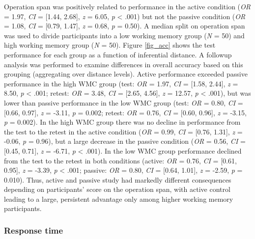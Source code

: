 \documentclass[floatsintext,man]{apa6}
\theoremstyle{definition}
\theoremstyle{definition}
\theoremstyle{definition}
\theoremstyle{remark}
\begin{document}
Operation span was positively related to performance in the active
condition (\emph{OR} = 1.97, \emph{CI} = {[}1.44, 2.68{]}, \emph{z} =
6.05, \emph{p} \textless{} .001) but not the passive condition
(\emph{OR} = 1.08, \emph{CI} = {[}0.79, 1.47{]}, \emph{z} = 0.68,
\emph{p} = 0.50). A median split on operation span was used to divide
participants into a low working memory group (\emph{N} = 50) and high
working memory group (\emph{N} = 50). Figure \ref{fig_acc} shows the
test performance for each group as a function of inferential distance. A
followup analysis was performed to examine differences in overall
accuracy based on this grouping (aggregating over distance levels).
Active performance exceeded passive performance in the high WMC group
(test: \emph{OR} = 1.97, \emph{CI} = {[}1.58, 2.44{]}, \emph{z} = 8.50,
\emph{p} \textless{} .001; retest: \emph{OR} = 3.48, \emph{CI} =
{[}2.65, 4.56{]}, \emph{z} = 12.57, \emph{p} \textless{} .001), but was
lower than passive performance in the low WMC group (test: \emph{OR} =
0.80, \emph{CI} = {[}0.66, 0.97{]}, \emph{z} = -3.11, \emph{p} = 0.002;
retest: \emph{OR} = 0.76, \emph{CI} = {[}0.60, 0.96{]}, \emph{z} =
-3.15, \emph{p} = 0.002). In the high WMC group there was no decline in
performance from the test to the retest in the active condition
(\emph{OR} = 0.99, \emph{CI} = {[}0.76, 1.31{]}, \emph{z} = -0.06,
\emph{p} = 0.96), but a large decrease in the passive condition
(\emph{OR} = 0.56, \emph{CI} = {[}0.45, 0.71{]}, \emph{z} = -6.71,
\emph{p} \textless{} .001). In the low WMC group performance declined
from the test to the retest in both conditions (active: \emph{OR} =
0.76, \emph{CI} = {[}0.61, 0.95{]}, \emph{z} = -3.39, \emph{p}
\textless{} .001; passive: \emph{OR} = 0.80, \emph{CI} = {[}0.64,
1.01{]}, \emph{z} = -2.59, \emph{p} = 0.010). Thus, active and passive
study had markedly different consequences depending on participants'
score on the operation span, with active control leading to a large,
persistent advantage only among higher working memory participants.

\subsubsection{Response time}\label{response-time}
\end{document}

